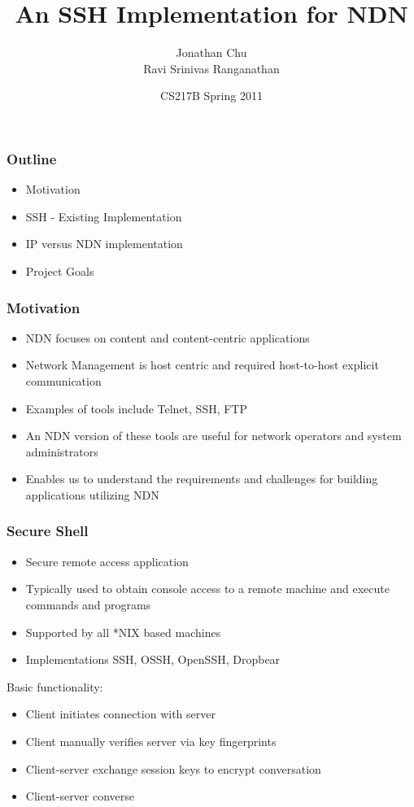 \documentclass[14pt]{beamer}
\title{An SSH Implementation for NDN}
\author{Jonathan Chu \\ Ravi Srinivas Ranganathan}
\date{CS217B Spring 2011}
\begin{document}
\begin{frame}
\maketitle
\end{frame}

\begin{frame}
    \frametitle{Outline}
    \begin{itemize}
        \item Motivation
        \item SSH - Existing Implementation
        \item IP versus NDN implementation
        \item Project Goals
    \end{itemize}
\end{frame}

\begin{frame}
    \frametitle{Motivation}
    \begin{itemize}
        \item NDN focuses on content and content-centric applications
        \item Network Management is host centric and required host-to-host explicit communication
        \item Examples of tools include Telnet, SSH, FTP
        \item An NDN version of these tools are useful for network operators and system administrators
        \item Enables us to understand the requirements and challenges for building applications utilizing NDN
        \end{itemize}
\end{frame}

\begin{frame}
    \frametitle{Secure Shell}
    \begin{itemize}
        \item Secure remote access application
        \item Typically used to obtain console access to a remote machine and execute commands and programs
        \item Supported by all *NIX based machines
        \item Implementations SSH, OSSH, OpenSSH, Dropbear
    \end{itemize}

    Basic functionality:
    \begin{itemize}
        \item Client initiates connection with server
        \item Client manually verifies server via key fingerprints
        \item Client-server exchange session keys to encrypt conversation
        \item Client-server converse
    \end{itemize}
\end{frame}
\end{document}
